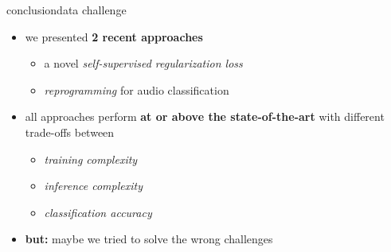 \begin{frame}{conclusion}{data challenge}
    \vspace{-2mm}
			\begin{itemize}
        \item   we presented \textbf{2 recent approaches}
            \begin{itemize}
                \item   a novel \textit{self-supervised regularization loss}
                \item   \textit{reprogramming} for audio classification
            \end{itemize}
            \bigskip
        \item   all approaches perform \textbf{at or above the state-of-the-art} with different trade-offs between
            \begin{itemize}
                \item   \textit{training complexity}
                \item   \textit{inference complexity}
                \item   \textit{classification accuracy}
            \end{itemize}
						\bigskip
				\item \textbf{but:} maybe we tried to solve the wrong challenges
    \end{itemize}
\end{frame}

